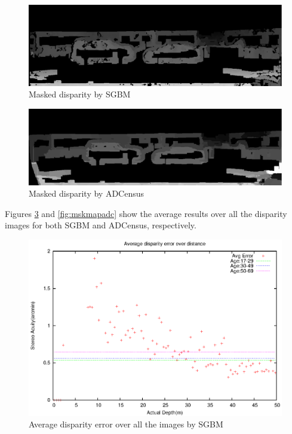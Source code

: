 \begin{figure}[H]
\centering
\includegraphics[scale=0.35]{5mdispsgb}
\caption{Masked disparity by SGBM}
\label{fig:imgmsk}
\end{figure} 

\begin{figure}[H]
\centering
\includegraphics[scale=0.35]{5mdispadc}
\caption{Masked disparity by ADCensus}
\label{fig:imgmsk}
\end{figure} 

\noindent
Figures \ref{fig:mskmapsgbm} and \ref{fig:mskmapadc} show the average results over all the disparity images for both SGBM and ADCensus, respectively.

\begin{figure}[H]
\centering
\includegraphics[scale=0.8]{sgbmmsk1000}
\caption{Average disparity error over all the images by SGBM}
\label{fig:mskmapsgbm}
\end{figure} 

